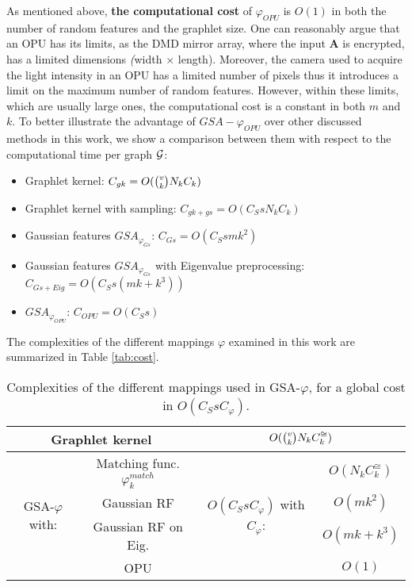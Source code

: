 As mentioned above, \textbf{the computational cost} of $\varphi_{OPU}$ is $O(1)$ in both the number of random features and the graphlet size. One can reasonably argue that an OPU has its limits, as the DMD mirror array, where the input $\mathbf{A}$ is encrypted, has a limited dimensions \emph(width $\times$ length). Moreover, the camera used to acquire the light intensity in an OPU has a limited number of pixels thus it introduces a limit on the maximum number of random features. However, within these limits, which are usually large ones, the computational cost is a constant in both $m$ and $k$. To better illustrate the advantage of $GSA-\varphi_{OPU}$ over other discussed methods in this work, we show a comparison between them with respect to the computational time per graph $\mathcal{G}$:
\begin{itemize}
    \item Graphlet kernel: $C_{gk}= O(\tbinom{v}{k} N_k C_k)$
    \item Graphlet kernel with sampling: $ C_{gk + gs}= O(C_S s N_k C_k)$
    \item Gaussian features $GSA_{\varphi_{Gs}}$: $C_{Gs}=O(C_S smk^2)$
    \item Gaussian features  $GSA_{\varphi_{Gs}}$ with Eigenvalue preprocessing: $C_{Gs+Eig}=O(C_S s(mk+k^3))$
    \item $GSA_{\varphi_{OPU}}$:  $C_{OPU}=O(C_S s)$
\end{itemize}

The complexities of the different mappings $\varphi$ examined in this work are summarized in Table \ref{tab:cost}.

\begin{table}
\centering
\begin{tabular}{|c|c|c|c|}
\hline
\multicolumn{2}{|c|}{Graphlet kernel} & \multicolumn{2}{|c|}{$O(\tbinom{v}{k} N_k C^{\cong}_k)$} \\ \hline \hline
%
\multirow{4}{*}{GSA-$\varphi$ with:} & Matching func. $\varphi^{match}_k$ & \multirow{4}{*}{$O(C_S s C_\varphi)$ with $C_\varphi$: } & $O(N_k C^{\cong}_k)$ \\
& Gaussian RF & & $O(m k^2)$ \\ 
& Gaussian RF on Eig. & & $O(m k + k^3)$ \\ 
& OPU  & & $O(1)$ \\ \hline
\end{tabular}
\caption{Complexities of the different mappings used in GSA-$\varphi$, for a global cost in $O(C_S s C_ \varphi)$.}
\end{table}

